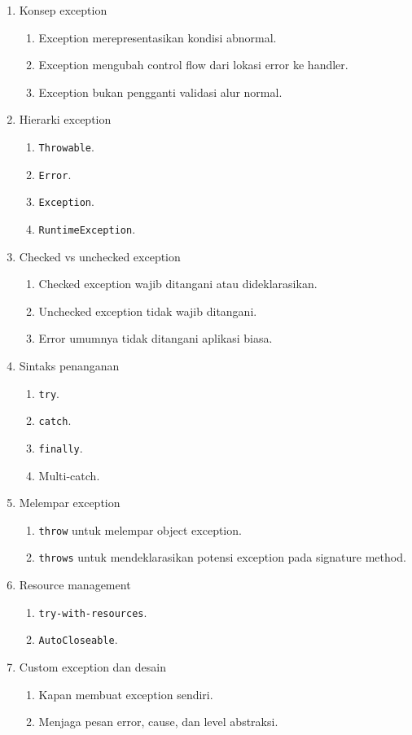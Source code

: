 \begin{enumerate}
    \item Konsep exception
    \begin{enumerate}
        \item Exception merepresentasikan kondisi abnormal.
        \item Exception mengubah control flow dari lokasi error ke handler.
        \item Exception bukan pengganti validasi alur normal.
    \end{enumerate}
    \item Hierarki exception
    \begin{enumerate}
        \item \texttt{Throwable}.
        \item \texttt{Error}.
        \item \texttt{Exception}.
        \item \texttt{RuntimeException}.
    \end{enumerate}
    \item Checked vs unchecked exception
    \begin{enumerate}
        \item Checked exception wajib ditangani atau dideklarasikan.
        \item Unchecked exception tidak wajib ditangani.
        \item Error umumnya tidak ditangani aplikasi biasa.
    \end{enumerate}
    \item Sintaks penanganan
    \begin{enumerate}
        \item \texttt{try}.
        \item \texttt{catch}.
        \item \texttt{finally}.
        \item Multi-catch.
    \end{enumerate}
    \item Melempar exception
    \begin{enumerate}
        \item \texttt{throw} untuk melempar object exception.
        \item \texttt{throws} untuk mendeklarasikan potensi exception pada signature method.
    \end{enumerate}
    \item Resource management
    \begin{enumerate}
        \item \texttt{try-with-resources}.
        \item \texttt{AutoCloseable}.
    \end{enumerate}
    \item Custom exception dan desain
    \begin{enumerate}
        \item Kapan membuat exception sendiri.
        \item Menjaga pesan error, cause, dan level abstraksi.
    \end{enumerate}
\end{enumerate}

